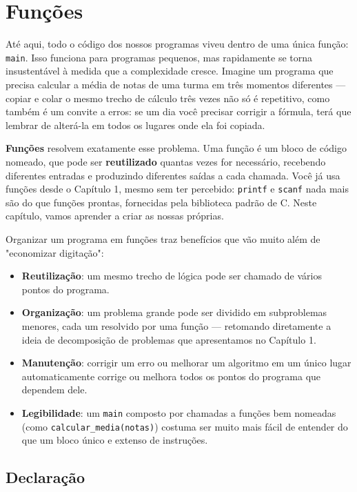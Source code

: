 \documentclass[12pt,a4paper,oneside]{extreport}
\begin{document}

\chapter{Funções}

Até aqui, todo o código dos nossos programas viveu dentro de uma única função: \texttt{main}. Isso funciona para programas pequenos, mas rapidamente se torna insustentável à medida que a complexidade cresce. Imagine um programa que precisa calcular a média de notas de uma turma em três momentos diferentes — copiar e colar o mesmo trecho de cálculo três vezes não só é repetitivo, como também é um convite a erros: se um dia você precisar corrigir a fórmula, terá que lembrar de alterá-la em todos os lugares onde ela foi copiada.

\textbf{Funções} resolvem exatamente esse problema. Uma função é um bloco de código nomeado, que pode ser \textbf{reutilizado} quantas vezes for necessário, recebendo diferentes entradas e produzindo diferentes saídas a cada chamada. Você já usa funções desde o Capítulo 1, mesmo sem ter percebido: \texttt{printf} e \texttt{scanf} nada mais são do que funções prontas, fornecidas pela biblioteca padrão de C. Neste capítulo, vamos aprender a criar as nossas próprias.

Organizar um programa em funções traz benefícios que vão muito além de "economizar digitação":

\begin{itemize}
    \item \textbf{Reutilização}: um mesmo trecho de lógica pode ser chamado de vários pontos do programa.
    \item \textbf{Organização}: um problema grande pode ser dividido em subproblemas menores, cada um resolvido por uma função — retomando diretamente a ideia de decomposição de problemas que apresentamos no Capítulo 1.
    \item \textbf{Manutenção}: corrigir um erro ou melhorar um algoritmo em um único lugar automaticamente corrige ou melhora todos os pontos do programa que dependem dele.
    \item \textbf{Legibilidade}: um \texttt{main} composto por chamadas a funções bem nomeadas (como \texttt{calcular\_media(notas)}) costuma ser muito mais fácil de entender do que um bloco único e extenso de instruções.
\end{itemize}

\section{Declaração}
\end{document}
